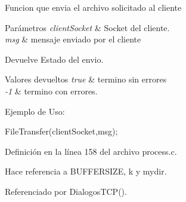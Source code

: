 Funcion que envia el archivo solicitado al cliente


\begin{DoxyParams}{Parámetros}
{\em clientSocket} & Socket del cliente. \\
\hline
{\em msg} & mensaje enviado por el cliente\\
\hline
\end{DoxyParams}
\begin{DoxyReturn}{Devuelve}
Estado del envio. 
\end{DoxyReturn}

\begin{DoxyRetVals}{Valores devueltos}
{\em true} & termino sin errores \\
\hline
{\em -\/1} & termino con errores.\\
\hline
\end{DoxyRetVals}
Ejemplo de Uso: 
\begin{DoxyCode}
                
                FileTransfer(clientSocket,msg);  
\end{DoxyCode}
 

Definición en la línea 158 del archivo process.c.



Hace referencia a BUFFERSIZE, k y mydir.



Referenciado por DialogosTCP().


